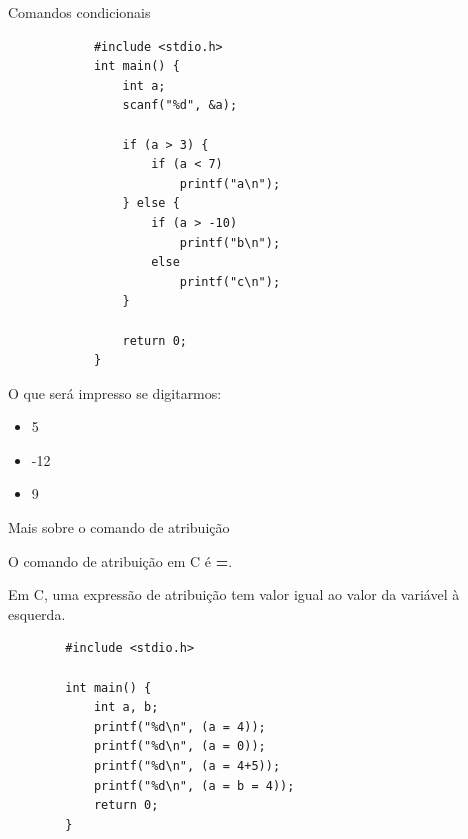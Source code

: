 \documentclass[handout]{beamer}
\begin{document}
\begin{frame}[fragile]{Comandos condicionais}

    \begin{minipage}{0.5\textwidth}
        \begin{verbatim}
            #include <stdio.h>
            int main() {
                int a;
                scanf("%d", &a);

                if (a > 3) {
                    if (a < 7)
                        printf("a\n");
                } else {
                    if (a > -10)
                        printf("b\n");
                    else
                        printf("c\n");
                }

                return 0;
            }
        \end{verbatim}
    \end{minipage}
    \begin{minipage}{0.35\textwidth}
        O que será impresso se digitarmos:
        \begin{itemize}[<+->]
            \item 5
            \item -12
            \item 9
        \end{itemize}
    \end{minipage}
\end{frame}

\begin{frame}[fragile]{Mais sobre o comando de atribuição}

    O comando de atribuição em C é \textbf{=}.

    Em C, uma expressão de atribuição tem valor igual ao valor da variável à esquerda.

    \begin{verbatim}
        #include <stdio.h>

        int main() {
            int a, b;
            printf("%d\n", (a = 4));
            printf("%d\n", (a = 0));
            printf("%d\n", (a = 4+5));
            printf("%d\n", (a = b = 4));
            return 0;
        }
    \end{verbatim}
\end{frame}
\end{document}
